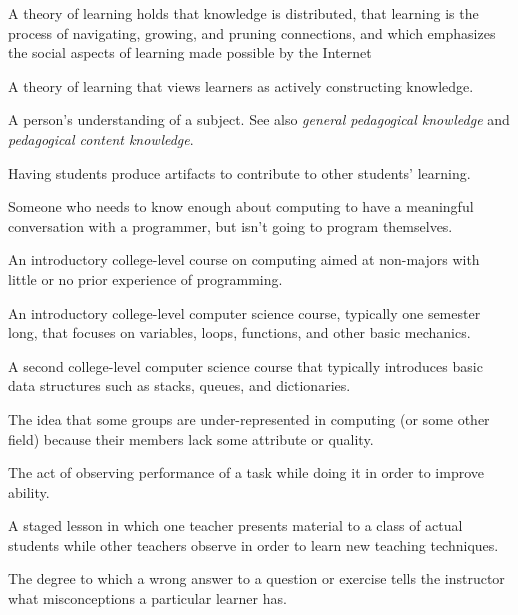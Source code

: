 \begin{description}
 A theory of learning holds
that knowledge is distributed, that learning is the process of
navigating, growing, and pruning connections, and which emphasizes the
social aspects of learning made possible by the Internet

 A theory of learning that
views learners as actively constructing knowledge.

 A person's
understanding of a subject. See also \emph{general pedagogical
knowledge} and \emph{pedagogical content knowledge}.

Having students produce artifacts to contribute to other students'
learning.

Someone who needs to know enough about computing to have a meaningful
conversation with a programmer, but isn't going to program themselves.

 An introductory college-level course on
computing aimed at non-majors with little or no prior experience of
programming.

 An introductory college-level computer science
course, typically one semester long, that focuses on variables, loops,
functions, and other basic mechanics.

 A second college-level computer science course
that typically introduces basic data structures such as stacks,
queues, and dictionaries.


 The idea that some groups
are under-represented in computing (or some other field) because their
members lack some attribute or quality.

 The act of
observing performance of a task while doing it in order to improve
ability.

 A staged
lesson in which one teacher presents material to a class of actual
students while other teachers observe in order to learn new teaching
techniques.

 The degree to which a
wrong answer to a question or exercise tells the instructor what
misconceptions a particular learner has.


\end{description}
